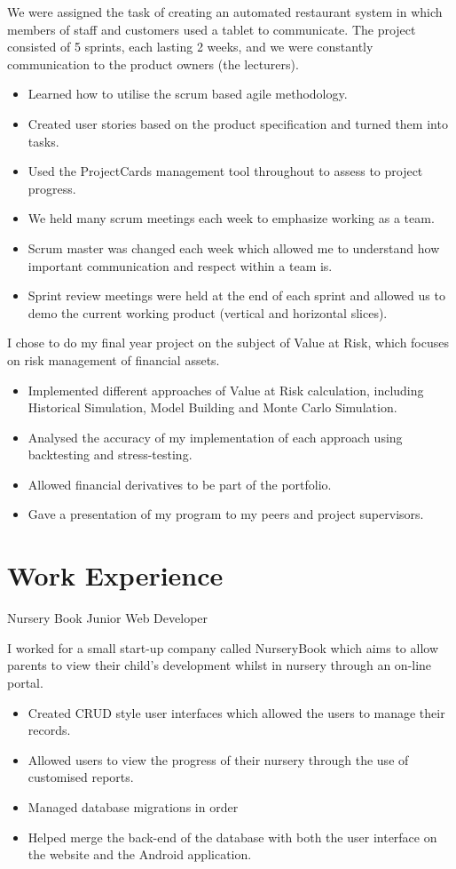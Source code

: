 \documentclass[10pt,a4paper]{moderncv}
\begin{document}
{
	We were assigned the task of creating an automated restaurant system in which members of staff and customers used a tablet to communicate. The project consisted of 5 sprints, each lasting 2 weeks, and we were constantly communication to the product owners (the lecturers).
	\begin{itemize}
		\item Learned how to utilise the scrum based agile methodology.
		\item Created user stories based on the product specification and turned them into tasks.
		\item Used the ProjectCards management tool throughout to assess to project progress.
		\item We held many scrum meetings each week to emphasize working as a team.
		\item Scrum master was changed each week which allowed me to understand how important communication and respect within a team is.
		\item Sprint review meetings were held at the end of each sprint and allowed us to demo the current working product (vertical and horizontal slices).
	\end{itemize}
}
{
	I chose to do my final year project on the subject of Value at Risk, which focuses on risk management of financial assets.
	\begin{itemize}
		\item Implemented different approaches of Value at Risk calculation, including Historical Simulation, Model Building and Monte Carlo Simulation.
		\item Analysed the accuracy of my implementation of each approach using backtesting and stress-testing.
		\item Allowed financial derivatives to be part of the portfolio.
		\item Gave a presentation of my program to my peers and project supervisors.
	\end{itemize}
}

\section{Work Experience}
{Nursery Book}
{Junior Web Developer}
{}
{}
{
	I worked for a small start-up company called NurseryBook which aims to allow parents to view their child's development whilst in nursery through an on-line portal.
	\begin{itemize}
		\item Created CRUD style user interfaces which allowed the users to manage their records.
		\item Allowed users to view the progress of their nursery through the use of customised reports.
		\item Managed database migrations in order 
		\item Helped merge the back-end of the database with both the user interface on the website and the Android application.
	\end{itemize}
}
\end{document}
